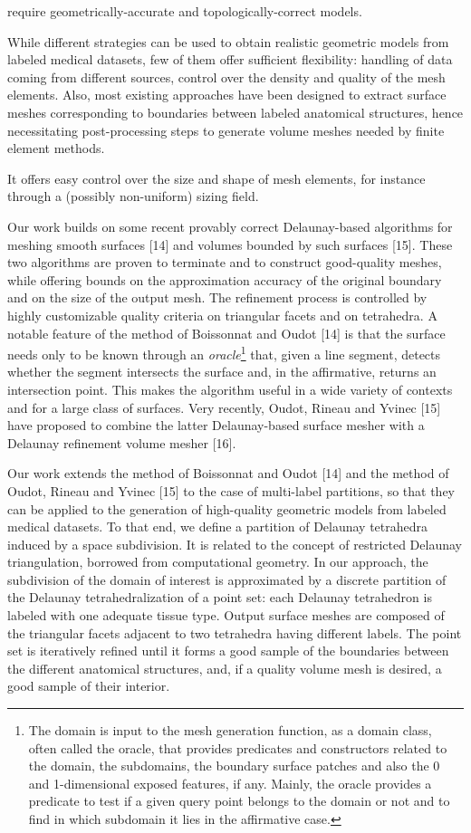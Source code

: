 {


require geometrically-accurate and topologically-correct models. 


While different strategies can be used to obtain realistic geometric models from labeled medical datasets, few of them offer sufficient flexibility: handling of data coming from different sources, control over the density and quality of the mesh elements. Also, most existing approaches have been designed to extract surface meshes corresponding to boundaries between labeled anatomical structures, hence necessitating post-processing steps to generate volume meshes needed by finite element methods.

 It offers easy control over the size and shape of mesh elements, for instance through a (possibly non-uniform) sizing field.

Our work builds on some recent provably correct Delaunay-based algorithms for meshing smooth surfaces [14] and volumes bounded by such surfaces [15]. These two algorithms are proven to terminate and to construct good-quality meshes, while offering bounds on the approximation accuracy of the original boundary and on the size of the output mesh. The refinement process is controlled by highly customizable quality criteria on triangular facets and on tetrahedra. A notable feature of the method of Boissonnat and Oudot [14] is that the surface needs only to be known through an {\it oracle}\footnote{The domain is input to the mesh generation function, as a domain class, often called the oracle, that provides predicates and constructors related to the domain, the subdomains, the boundary surface patches and also the 0 and 1-dimensional exposed features, if any. Mainly, the oracle provides a predicate to test if a given query point belongs to the domain or not and to find in which subdomain it lies in the affirmative case.} that, given a line segment, detects whether the segment intersects the surface and, in the affirmative, returns an intersection point. This makes the algorithm useful in a wide variety of contexts and for a large class of surfaces. Very recently, Oudot, Rineau and Yvinec [15] have proposed to combine the latter Delaunay-based surface mesher with a Delaunay refinement volume mesher [16].

Our work extends the method of Boissonnat and Oudot [14] and the method of Oudot, Rineau and Yvinec [15] to the case of multi-label partitions, so that they can be applied to the generation of high-quality geometric models from labeled medical datasets. To that end, we define a partition of Delaunay tetrahedra induced by a space subdivision. It is related to the concept of restricted Delaunay triangulation, borrowed from computational geometry. In our approach, the subdivision of the domain of interest is approximated by a discrete partition of the Delaunay tetrahedralization of a point set: each Delaunay tetrahedron is labeled with one adequate tissue type. Output surface meshes are composed of the triangular facets adjacent to two tetrahedra having different labels. The point set is iteratively refined until it forms a good sample of the boundaries between the different anatomical structures, and, if a quality volume mesh is desired, a good sample of their interior.

}
